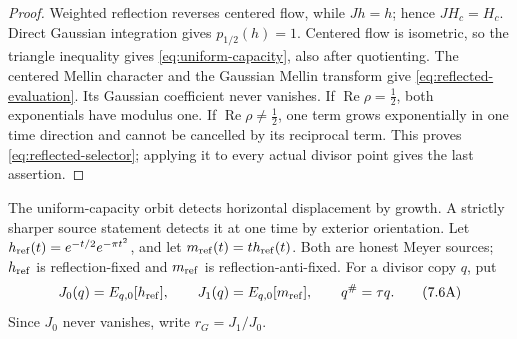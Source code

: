 \documentclass[11pt]{article}
\theoremstyle{definition}
\theoremstyle{remark}
\newcommand{\Rea}{\operatorname{Re}}
\begin{document}
\begin{proof}
Weighted reflection reverses centered flow, while \(Jh=h\); hence
\(JH_c=H_c\).  Direct Gaussian integration gives
\(p_{1/2}(h)=1\).  Centered flow is isometric, so the triangle inequality
gives \eqref{eq:uniform-capacity}, also after quotienting.  The centered
Mellin character and the Gaussian Mellin transform give
\eqref{eq:reflected-evaluation}.  Its Gaussian coefficient never vanishes.
If \(\Rea\rho=\tfrac12\), both exponentials have modulus one.  If
\(\Rea\rho\ne\tfrac12\), one term grows exponentially in one time
direction and cannot be cancelled by its reciprocal term.  This proves
\eqref{eq:reflected-selector}; applying it to every actual divisor point
gives the last assertion.
\end{proof}

The uniform-capacity orbit detects horizontal displacement by growth.  A
strictly sharper source statement detects it at one time by exterior
orientation.  Let \(h_{\rm ref}(t)=e^{-t/2}e^{-\pi t^2}\), and let
\(m_{\rm ref}(t)=t h_{\rm ref}(t)\).  Both are honest Meyer sources;
\(h_{\rm ref}\) is reflection-fixed and \(m_{\rm ref}\) is
reflection-anti-fixed.  For a divisor copy \(q\), put
\[
 J_0(q)=E_{q,0}[h_{\rm ref}],\qquad
 J_1(q)=E_{q,0}[m_{\rm ref}],\qquad q^\#=\tau q.
\tag{7.6A}\label{eq:gaussian-source-pair}
\]
Since \(J_0\) never vanishes, write \(r_G=J_1/J_0\).
\end{document}
